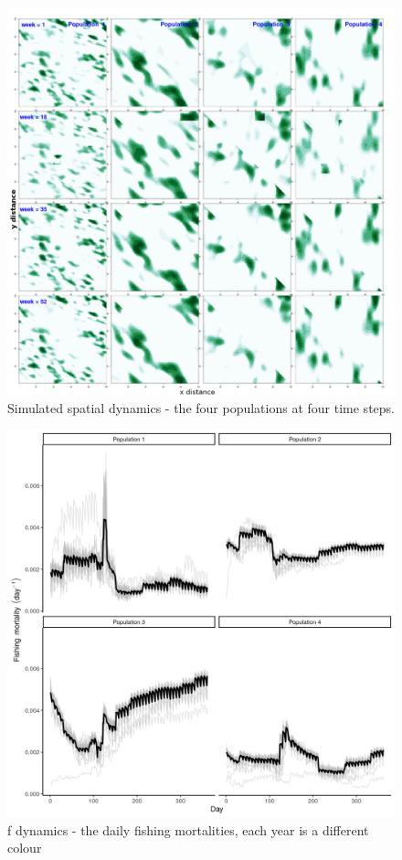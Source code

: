 \documentclass[review]{elsarticle}
\begin{document}
\begin{figure}[!ht]
	\includegraphics[width = \linewidth]{Plots/pop_dist}
	\caption{Simulated spatial dynamics - the four populations at four time steps.
		}
	\label{fig:9}
\end{figure}	

\begin{figure}[!ht]
	\includegraphics[width = \linewidth]{Plots/f_dynamics}
	\caption{f dynamics - the daily fishing mortalities, each year is a
		different colour}
	\label{fig:10}
\end{figure}	
\end{document}
